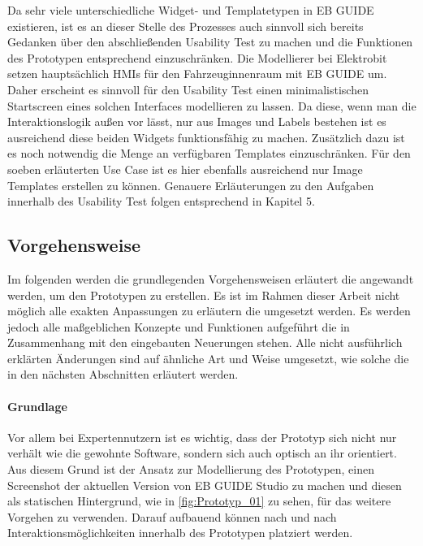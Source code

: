 Da sehr viele unterschiedliche Widget- und Templatetypen in EB GUIDE existieren, ist es an dieser Stelle des Prozesses auch sinnvoll sich bereits Gedanken über den abschließenden Usability Test zu machen und die Funktionen des Prototypen entsprechend einzuschränken.
Die Modellierer bei Elektrobit setzen hauptsächlich HMIs für den Fahrzeuginnenraum mit EB GUIDE um.
Daher erscheint es sinnvoll für den Usability Test einen minimalistischen Startscreen eines solchen Interfaces modellieren zu lassen.
Da diese, wenn man die Interaktionslogik außen vor lässt, nur aus Images und Labels bestehen ist es ausreichend diese beiden Widgets funktionsfähig zu machen.
Zusätzlich dazu ist es noch notwendig die Menge an verfügbaren Templates einzuschränken.
Für den soeben erläuterten Use Case ist es hier ebenfalls ausreichend nur Image Templates erstellen zu können.
Genauere Erläuterungen zu den Aufgaben innerhalb des Usability Test folgen entsprechend in Kapitel 5.


\subsection{Vorgehensweise}
Im folgenden werden die grundlegenden Vorgehensweisen erläutert die angewandt werden, um den Prototypen zu erstellen.
Es ist im Rahmen dieser Arbeit nicht möglich alle exakten Anpassungen zu erläutern die umgesetzt werden.
Es werden jedoch alle maßgeblichen Konzepte und Funktionen aufgeführt die in Zusammenhang mit den eingebauten Neuerungen stehen.
Alle nicht ausführlich erklärten Änderungen sind auf ähnliche Art und Weise umgesetzt, wie solche die in den nächsten Abschnitten erläutert werden.

\paragraph{Grundlage}
Vor allem bei Expertennutzern ist es wichtig, dass der Prototyp sich nicht nur verhält wie die  gewohnte Software, sondern sich auch optisch an ihr orientiert.
Aus diesem Grund ist der Ansatz zur Modellierung des Prototypen, einen Screenshot der aktuellen Version von EB GUIDE Studio zu machen und diesen als statischen Hintergrund, wie in \cref{fig:Prototyp_01} zu sehen, für das weitere Vorgehen zu verwenden.
Darauf aufbauend können nach und nach Interaktionsmöglichkeiten innerhalb des Prototypen platziert werden.

